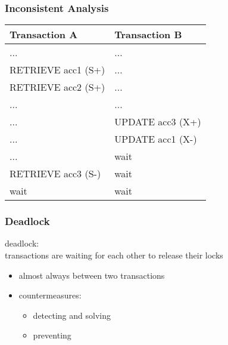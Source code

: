 \documentclass[dvipsnames]{beamer}
\theoremstyle{plain}
\begin{document}
\begin{frame}[fragile]
  \frametitle{Inconsistent Analysis}

  \begin{example}[sum of accounts: acc1=40, acc2=50, acc3=30]
    \begin{table}
      \begin{tabular}{ll}
Transaction A        & Transaction B   \\\hline
...                  & ...             \\\pause
RETRIEVE acc1 (S+)   & ...             \\\pause
RETRIEVE acc2 (S+)   & ...             \\\pause
...                  & ...             \\
...                  & UPDATE acc3 (X+)\\\pause
...                  & UPDATE acc1 (X-)\\
...                  & wait            \\\pause
RETRIEVE acc3 (S-)   & wait            \\
wait                 & wait
      \end{tabular}
    \end{table}
  \end{example}
\end{frame}

\begin{frame}
  \frametitle{Deadlock}

  \begin{definition}
    \alert{deadlock}:\\
      transactions are waiting for each other to release their locks
  \end{definition}

  \pause
  \begin{itemize}
    \item almost always between two transactions
    \item countermeasures:
    \begin{itemize}
      \item detecting and solving
      \item preventing
    \end{itemize}
  \end{itemize}
\end{frame}
\end{document}
